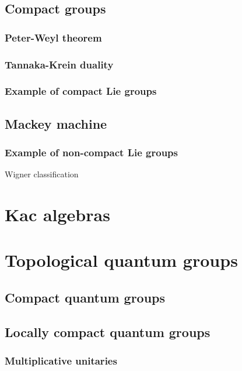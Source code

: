 \documentclass{../../large}
\begin{document}
\chapter{Compact groups}
\section{Peter-Weyl theorem}
\section{Tannaka-Krein duality}
\section{Example of compact Lie groups}

\chapter{Mackey machine}
\section{Example of non-compact Lie groups}
Wigner classification








\part{Kac algebras}





\part{Topological quantum groups}
\chapter{Compact quantum groups}
\chapter{Locally compact quantum groups}
\section{Multiplicative unitaries}
\end{document}
